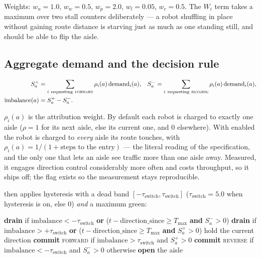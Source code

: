 Weights: $w_u = 1.0$, $w_w = 0.5$, $w_p = 2.0$, $w_l = 0.05$, $w_c = 0.5$. The
$W_i$ term takes a maximum over two stall counters deliberately --- a robot
shuffling in place without gaining route distance is starving just as much as
one standing still, and should be able to flip the aisle.

\subsection{Aggregate demand and the decision rule}
\label{sec:aisle-decision}

\begin{align}
  S_a^{+} &= \sum_{i \ \mathrm{requesting}\ \textsc{forward}} \rho_i(a)\, \mathrm{demand}_i(a),
  &
  S_a^{-} &= \sum_{i \ \mathrm{requesting}\ \textsc{reverse}} \rho_i(a)\, \mathrm{demand}_i(a),
  \\
  \mathrm{imbalance}(a) &= S_a^{+} - S_a^{-}. &&
\end{align}

$\rho_i(a)$ is the attribution weight. By default each robot is charged to
exactly one aisle ($\rho = 1$ for its next aisle, else its current one, and $0$
elsewhere). With  enabled the robot is charged to
\emph{every} aisle its route touches, with
$\rho_i(a) = 1 / (1 + \text{steps to the entry})$ --- the literal reading of
the specification, and the only one that lets an aisle see traffic more than
one aisle away. Measured, it engages direction control considerably more often
and costs throughput, so it ships off; the flag exists so the measurement stays
reproducible.

 then applies hysteresis with a dead band
$[-\tau_{\mathrm{switch}}, \tau_{\mathrm{switch}}]$ ($\tau_{\mathrm{switch}} =
5.0$ when hysteresis is on, else $0$) \emph{and} a maximum green:

\begin{algorithm}[H]
\caption{}
\begin{algorithmic}[1]
  \State \textbf{drain} if $\mathrm{imbalance} < -\tau_{\mathrm{switch}}$
    \textbf{ or } ($t - \mathrm{direction\_since} \geq T_{\max}$ \textbf{ and } $S_a^{-} > 0$)
  \State \textbf{drain} if $\mathrm{imbalance} > +\tau_{\mathrm{switch}}$
    \textbf{ or } ($t - \mathrm{direction\_since} \geq T_{\max}$ \textbf{ and } $S_a^{+} > 0$)
  \State hold the current direction 
  \State \textbf{commit} \textsc{forward} if $\mathrm{imbalance} > \tau_{\mathrm{switch}}$ and $S_a^{+} > 0$
  \State \textbf{commit} \textsc{reverse} if $\mathrm{imbalance} < -\tau_{\mathrm{switch}}$ and $S_a^{-} > 0$
  \State otherwise \textbf{open} the aisle
\EndIf
\end{algorithmic}
\end{algorithm}

